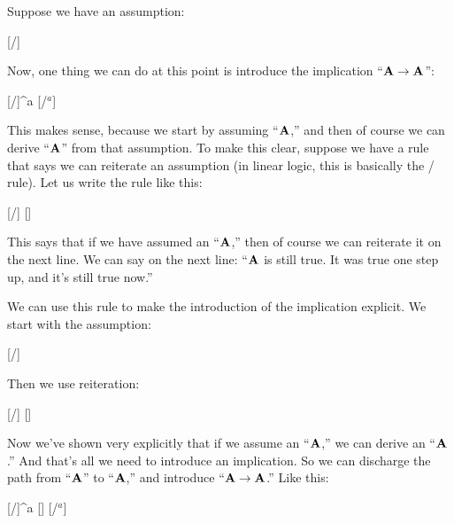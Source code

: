 \documentclass[../../../main.tex]{subfiles}
\begin{document}
Suppose we have an assumption:

\begin{prooftree*}
  \hypo{}
  [\startrule/]{}
\end{prooftree*}

\noindent
Now, one thing we can do at this point is introduce the implication ``$\nd{A \impl/ A}$'':

\begin{prooftree*}
  \hypo{}
  [\startrule/]{^{a}}
  [\implIntro/$^{a}$]{}
\end{prooftree*}

\noindent
This makes sense, because we start by assuming ``$\mathbf{A}$,'' and then of course we can derive ``$\mathbf{A}$'' from that assumption. To make this clear, suppose we have a rule that says we can reiterate an assumption (in linear logic, this is basically the \bangCopy/ rule). Let us write the rule like this:

\begin{prooftree*}
  \hypo{}
  [\startrule/]{}
  []{}
\end{prooftree*}

\noindent
This says that if we have assumed an ``$\mathbf{A}$,'' then of course we can reiterate it on the next line. We can say on the next line: ``$\mathbf{A}$ is still true. It was true one step up, and it's still true now.'' 

We can use this rule to make the introduction of the implication explicit. We start with the assumption:

\begin{prooftree*}
  \hypo{}
  [\startrule/]{}
\end{prooftree*}

\noindent
Then we use reiteration:

\begin{prooftree*}
  \hypo{}
  [\startrule/]{}
  []{}
\end{prooftree*}

\noindent
Now we've shown very explicitly that if we assume an ``$\mathbf{A}$,'' we can derive an ``$\mathbf{A}$.'' And that's all we need to introduce an implication. So we can discharge the path from ``$\mathbf{A}$'' to ``$\mathbf{A}$,'' and introduce ``$\nd{A \impl/ A}$.'' Like this:

\begin{prooftree*}
  \hypo{}
  [\startrule/]{^{a}}
  []{}
  [\implIntro/$^{a}$]{}
\end{prooftree*}
\end{document}
